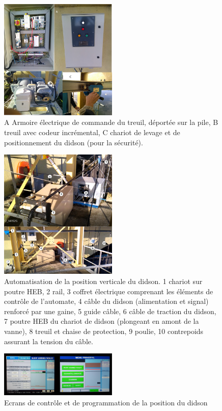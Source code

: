 \documentclass[11pt,twocolumn,titlepage,twoside]{article}
\begin{document}
\begin{figure}[htbp]
\centering
\includegraphics[width=0.5\textwidth]{automate2.png}
\caption[automatisation]{A Armoire électrique de commande du treuil,
déportée sur la pile, B treuil avec codeur incrémental, C chariot de levage et
de positionnement du didson (pour la sécurité). }
\label{automate2}
\end{figure}
\begin{figure}[htbp]
\centering
\includegraphics[width=0.5\textwidth]{automate3.png}
\caption[automatisation]{Automatisation de la position verticale du didson. 1
chariot sur poutre HEB, 2 rail, 3 coffret électrique comprenant les éléments de
contrôle de l'automate, 4 câble du didson (alimentation et signal) renforcé par une gaine, 5 guide
câble, 6 câble de traction du didson, 7 poutre HEB du chariot de didson
(plongeant en amont de la vanne), 8 treuil et chaise de protection, 9 poulie, 10 contrepoids assurant la
tension du câble. }
\label{automate3}
\end{figure}
\begin{figure}[htbp]
\centering
\includegraphics[width=0.5\textwidth]{ihm2.png}
\caption[automatisation]{Ecrans de contrôle et de programmation de la position
du didson}
\label{ihm}
\end{figure}
\end{document}
